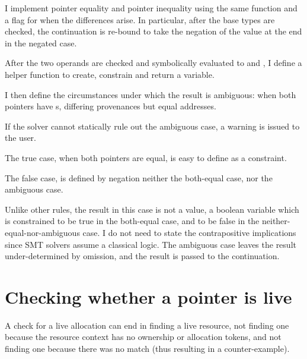 I implement pointer equality and pointer inequality using the same function and
a flag for when the differences arise. In particular, after the base types are
checked, the continuation is re-bound to take the negation of the value at the
end in the negated case.


After the two operands are checked and symbolically evaluated to
 and , I define a helper function to create,
constrain and return a variable.


I then define the circumstances under which the result is ambiguous: when both
pointers have s, differing provenances but equal addresses.


If the solver cannot statically rule out the ambiguous case, a warning is
issued to the user.


The true case, when both pointers are equal, is easy to define as a constraint.


The false case, is defined by negation \textemdash{} neither the both-equal
case, nor the ambiguous case.


Unlike other rules, the result in this case is not a value, a boolean variable
which is constrained to be true in the both-equal case, and to be false in the
neither-equal-nor-ambiguous case. I do not need to state the contrapositive
implications since SMT solvers assume a classical logic. The ambiguous case
leaves the result under-determined by omission, and the result is passed to the
continuation.


\section{Checking whether a pointer is live}

A check for a live allocation can end in finding a live resource, not finding
one because the resource context has no ownership or allocation tokens, and not
finding one because there was no match (thus resulting in a counter-example).

